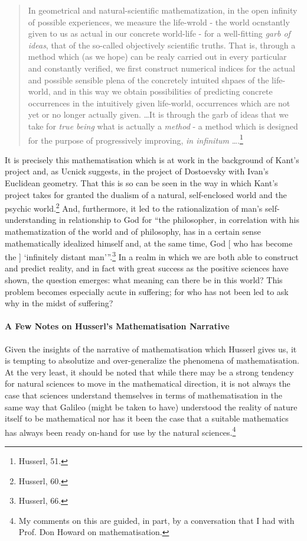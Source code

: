 \documentclass[12pt]{article}
\begin{document}
	\begin{quote}
	\singlespacing
	\footnotesize
	
	In geometrical and natural-scientific mathematization, in the open infinity of possible experiences, we measure the life-wrold - the world ocnstantly given to us as actual in our concrete world-life - for a well-fitting \emph{garb of ideas}, that of the so-called objectively scientific truths. That is, through a method which (as we hope) can be realy carried out in every particular and constantly verified, we first construct numerical indices for the actual and possible sensible plena of the concretely intuited shpaes of the life-world, and in this way we obtain possibilities of predicting concrete occurrences in the intuitively given life-world, occurrences which are not yet or no longer actually given. \ldots It is through the garb of ideas that we take for \emph{true being} what is actually a \emph{method} - a method which is designed for the purpose of progressively improving, \emph{in infinitum} \ldots.\footnote{Husserl, 51.}
	
	\end{quote}
	
	 It is precisely this mathematisation which is at work in the background of Kant's project and, as Ucnick suggests, in the project of Dostoevsky with Ivan's Euclidean geometry. That this is so can be seen in the way in which Kant's project takes for granted the dualism of a natural, self-enclosed world and the psychic world.\footnote{Husserl, 60.} And, furthermore, it led to the rationalization of man's self-understanding in relationship to God for ``the philosopher, in correlation with his mathematization of the world and of philosophy, has in a certain sense mathematically idealized himself and, at the same time, God [ who has become the ] `infinitely distant man'\thinspace''.\footnote{Husserl, 66.} In a realm in which we are both able to construct and predict reality, and in fact with great success as the positive sciences have shown, the question emerges: what meaning can there be in this world? This problem becomes especially acute in suffering; for who has not been led to ask why in the midst of suffering?
	 
	 \paragraph*{A Few Notes on Husserl's Mathematisation Narrative}
	 
	 Given the insights of the narrative of mathematisation which Husserl gives us, it is tempting to absolutize and over-generalize the phenomena of mathematisation. At the very least, it should be noted that while there may be a strong tendency for natural sciences to move in the mathematical direction, it is not always the case that sciences understand themselves in terms of mathematisation in the same way that Galileo (might be taken to have) understood the reality of nature itself to be mathematical nor has it been the case that a suitable mathematics has always been ready on-hand for use by the natural sciences.\footnote{My comments on this are guided, in part, by a conversation that I had with Prof. Don Howard on mathematisation.}
	 
\end{document}
